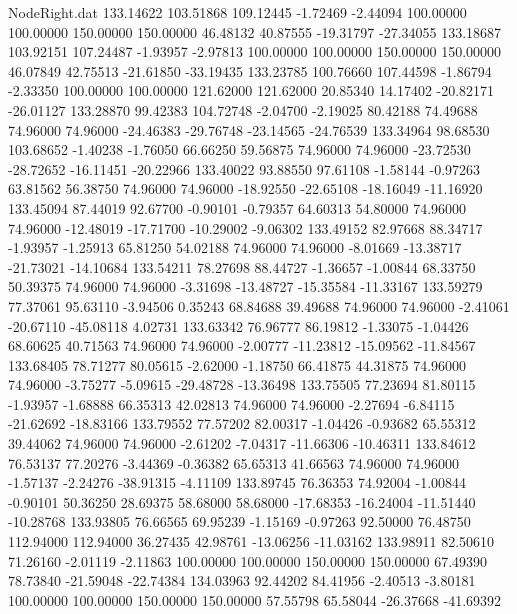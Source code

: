 \begin{filecontents}{NodeRight.dat}
 133.14622  103.51868  109.12445    -1.72469   -2.44094  100.00000  100.00000  150.00000  150.00000   46.48132   40.87555  -19.31797  -27.34055
 133.18687  103.92151  107.24487    -1.93957   -2.97813  100.00000  100.00000  150.00000  150.00000   46.07849   42.75513  -21.61850  -33.19435
 133.23785  100.76660  107.44598    -1.86794   -2.33350  100.00000  100.00000  121.62000  121.62000   20.85340   14.17402  -20.82171  -26.01127
 133.28870   99.42383  104.72748    -2.04700   -2.19025   80.42188   74.49688   74.96000   74.96000  -24.46383  -29.76748  -23.14565  -24.76539
 133.34964   98.68530  103.68652    -1.40238   -1.76050   66.66250   59.56875   74.96000   74.96000  -23.72530  -28.72652  -16.11451  -20.22966
 133.40022   93.88550   97.61108    -1.58144   -0.97263   63.81562   56.38750   74.96000   74.96000  -18.92550  -22.65108  -18.16049  -11.16920
 133.45094   87.44019   92.67700    -0.90101   -0.79357   64.60313   54.80000   74.96000   74.96000  -12.48019  -17.71700  -10.29002   -9.06302
 133.49152   82.97668   88.34717    -1.93957   -1.25913   65.81250   54.02188   74.96000   74.96000   -8.01669  -13.38717  -21.73021  -14.10684
 133.54211   78.27698   88.44727    -1.36657   -1.00844   68.33750   50.39375   74.96000   74.96000   -3.31698  -13.48727  -15.35584  -11.33167
 133.59279   77.37061   95.63110    -3.94506    0.35243   68.84688   39.49688   74.96000   74.96000   -2.41061  -20.67110  -45.08118    4.02731
 133.63342   76.96777   86.19812    -1.33075   -1.04426   68.60625   40.71563   74.96000   74.96000   -2.00777  -11.23812  -15.09562  -11.84567
 133.68405   78.71277   80.05615    -2.62000   -1.18750   66.41875   44.31875   74.96000   74.96000   -3.75277   -5.09615  -29.48728  -13.36498
 133.75505   77.23694   81.80115    -1.93957   -1.68888   66.35313   42.02813   74.96000   74.96000   -2.27694   -6.84115  -21.62692  -18.83166
 133.79552   77.57202   82.00317    -1.04426   -0.93682   65.55312   39.44062   74.96000   74.96000   -2.61202   -7.04317  -11.66306  -10.46311
 133.84612   76.53137   77.20276    -3.44369   -0.36382   65.65313   41.66563   74.96000   74.96000   -1.57137   -2.24276  -38.91315   -4.11109
 133.89745   76.36353   74.92004    -1.00844   -0.90101   50.36250   28.69375   58.68000   58.68000  -17.68353  -16.24004  -11.51440  -10.28768
 133.93805   76.66565   69.95239    -1.15169   -0.97263   92.50000   76.48750  112.94000  112.94000   36.27435   42.98761  -13.06256  -11.03162
 133.98911   82.50610   71.26160    -2.01119   -2.11863  100.00000  100.00000  150.00000  150.00000   67.49390   78.73840  -21.59048  -22.74384
 134.03963   92.44202   84.41956    -2.40513   -3.80181  100.00000  100.00000  150.00000  150.00000   57.55798   65.58044  -26.37668  -41.69392

\end{filecontents}
